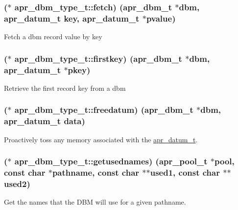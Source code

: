 \subsubsection[{\texorpdfstring{fetch}{fetch}}]{($\ast$ apr\+\_\+dbm\+\_\+type\+\_\+t\+::fetch) ({\bf apr\+\_\+dbm\+\_\+t} $\ast$dbm, {\bf apr\+\_\+datum\+\_\+t} {\bf key}, {\bf apr\+\_\+datum\+\_\+t} $\ast${\bf pvalue})}\hypertarget{structapr__dbm__type__t_aed236143d1ce8ee0edd76fa96332357e}{}\label{structapr__dbm__type__t_aed236143d1ce8ee0edd76fa96332357e}
Fetch a dbm record value by key 
\subsubsection[{\texorpdfstring{firstkey}{firstkey}}]{($\ast$ apr\+\_\+dbm\+\_\+type\+\_\+t\+::firstkey) ({\bf apr\+\_\+dbm\+\_\+t} $\ast$dbm, {\bf apr\+\_\+datum\+\_\+t} $\ast${\bf pkey})}\hypertarget{structapr__dbm__type__t_ac33084f64b59fd71b299aa4c0636f5ca}{}\label{structapr__dbm__type__t_ac33084f64b59fd71b299aa4c0636f5ca}
Retrieve the first record key from a dbm 
\subsubsection[{\texorpdfstring{freedatum}{freedatum}}]{($\ast$ apr\+\_\+dbm\+\_\+type\+\_\+t\+::freedatum) ({\bf apr\+\_\+dbm\+\_\+t} $\ast$dbm, {\bf apr\+\_\+datum\+\_\+t} {\bf data})}\hypertarget{structapr__dbm__type__t_a61c7cf2ac5f6e3d941bf56d2ba7dd646}{}\label{structapr__dbm__type__t_a61c7cf2ac5f6e3d941bf56d2ba7dd646}
Proactively toss any memory associated with the \hyperlink{structapr__datum__t}{apr\+\_\+datum\+\_\+t}. 
\subsubsection[{\texorpdfstring{getusednames}{getusednames}}]{($\ast$ apr\+\_\+dbm\+\_\+type\+\_\+t\+::getusednames) ({\bf apr\+\_\+pool\+\_\+t} $\ast${\bf pool}, const char $\ast${\bf pathname}, const char $\ast$$\ast${\bf used1}, const char $\ast$$\ast${\bf used2})}\hypertarget{structapr__dbm__type__t_a2fc5fed0a3353db2ba24cd8da6da04e8}{}\label{structapr__dbm__type__t_a2fc5fed0a3353db2ba24cd8da6da04e8}
Get the names that the D\+BM will use for a given pathname. 
